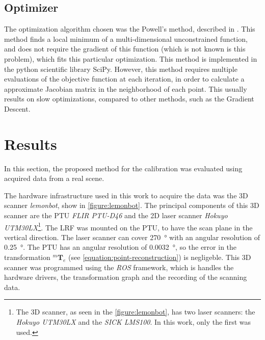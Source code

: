 \documentclass[conference]{IEEEtran}
\begin{document}
\subsection{Optimizer}

The optimization algorithm chosen was the Powell's method, described in \cite{powell64}. This method finds a local minimum of a multi-dimensional unconstrained function, and does not require the gradient of this function (which is not known is this problem), which fits this particular optimization. This method is implemented in the python scientific library SciPy. However, this method requires multiple evaluations of the objective function at each iteration, in order to calculate a approximate Jacobian matrix in the neighborhood of each point. This usually results on slow optimizations, compared to other methods, such as the Gradient Descent.

\section{Results}
\label{section:results}

In this section, the proposed method for the calibration was evaluated using acquired data from a real scene. 

The hardware infrastructure used in this work to acquire the data was the 3D scanner \textit{lemonbot}, show in \cref{figure:lemonbot}. The principal components of this 3D scanner are the PTU \textit{FLIR PTU-D46} and the 2D laser scanner \textit{Hokuyo UTM30LX}\footnote{The 3D scanner, as seen in the \cref{figure:lemonbot}, has two laser scanners: the \textit{Hokuyo UTM30LX} and the \textit{SICK LMS100}. In this work, only the first was used.}. The LRF was mounted on the PTU, to have the scan plane in the vertical direction. The laser scanner can cover \SI{270}{\degree} with an angular resolution of \SI{0.25}{\degree}. The PTU has an angular resolution of \SI{0.0032}{\degree}, so the error in the transformation $^{m}\mathbf{T}_{e}$ (see \cref{equation:point-reconstruction}) is negligeble. This 3D scanner was programmed using the \textit{ROS} framework, which is handles the hardware drivers, the transformation graph and the recording of the scanning data.
\end{document}
